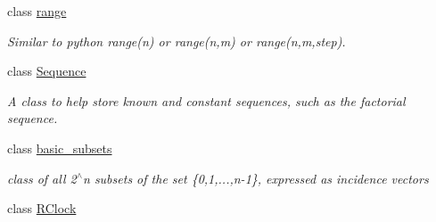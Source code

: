 \begin{DoxyCompactItemize}
class \hyperlink{classdscr_1_1range}{range}
\begin{DoxyCompactList}\small\item\em Similar to python range(n) or range(n,m) or range(n,m,step). \end{DoxyCompactList}\item 
class \hyperlink{classdscr_1_1_sequence}{Sequence}
\begin{DoxyCompactList}\small\item\em A class to help store known and constant sequences, such as the factorial sequence. \end{DoxyCompactList}\item 
class \hyperlink{classdscr_1_1basic__subsets}{basic\-\_\-subsets}
\begin{DoxyCompactList}\small\item\em class of all 2$^\wedge$n subsets of the set \{0,1,...,n-\/1\}, expressed as incidence vectors \end{DoxyCompactList}\item 
class \hyperlink{classdscr_1_1_r_clock}{R\-Clock}
\end{DoxyCompactItemize}
